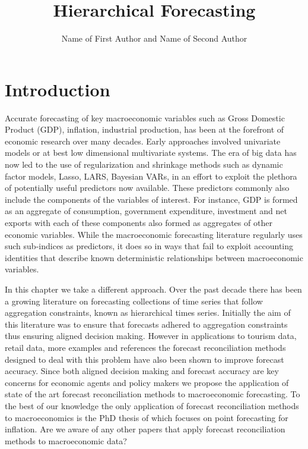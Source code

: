 \documentclass[graybox]{svmult}
\begin{document}
\title*{Hierarchical Forecasting}
\author{Name of First Author and Name of Second Author}
%
%
\maketitle

\section{Introduction}\label{sec:intro}
			
Accurate forecasting of key macroeconomic variables such as Gross Domestic Product (GDP), inflation, industrial production, has been at the forefront of economic research over many decades. Early approaches involved univariate models or at best low dimensional multivariate systems. The era of big data has now led to the use of regularization and shrinkage methods such as dynamic factor models, Lasso, LARS, Bayesian VARs, in an effort to exploit the plethora of potentially useful predictors now available. These predictors commonly also include the components of the variables of interest.  For instance, GDP is formed as an aggregate of consumption, government expenditure, investment and net exports with each of these components also formed as aggregates of other economic variables.  While the macroeconomic forecasting literature regularly uses such sub-indices as predictors, it does so in ways that fail to exploit accounting identities that describe known deterministic relationships between macroeconomic variables.

In this chapter we take a different approach.  Over the past decade there has been a growing literature on forecasting collections of time series that follow aggregation constraints, known as hierarchical times series.  Initially the aim of this literature was to ensure that forecasts adhered to aggregation constraints thus ensuring aligned decision making.  However in applications to tourism data, retail data, {\color{red} more  examples and references} the forecast reconciliation methods designed to deal with this problem have also been shown to improve forecast accuracy.  Since both aligned decision making and forecast accuracy are key concerns for economic agents and policy makers we propose the application of state of the art forecast reconciliation methods to macroeconomic forecasting. To the best of our knowledge the only application of forecast reconciliation methods to macroeconomics is the PhD thesis of \citep{weiss2018essays} which focuses on point forecasting for inflation. {\color{red} Are we aware of any other papers that apply forecast reconciliation methods to macroeconomic data?}
\end{document}

